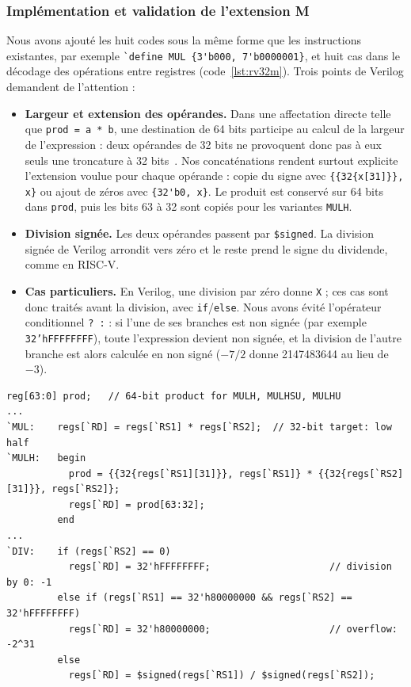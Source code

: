 \subsubsection{Implémentation et validation de l'extension M}
\label{sec:rv32im-impl}

Nous avons ajouté les huit codes sous la même forme que les instructions existantes, par exemple
\lstinline[style=vlinline]|`define MUL {3'b000, 7'b0000001}|, et huit cas dans le décodage des
opérations entre registres (code~\ref{lst:rv32m}). Trois points de Verilog demandent de
l'attention :
\begin{itemize}
\item \textbf{Largeur et extension des opérandes.} Dans une affectation directe telle que
\texttt{prod = a * b}, une destination de 64 bits participe au calcul de la largeur de
l'expression : deux opérandes de 32 bits ne provoquent donc pas à eux seuls une troncature
à 32 bits~\cite{systemverilog}. Nos concaténations rendent surtout explicite l'extension
voulue pour chaque opérande : copie du signe avec
\lstinline[style=vlinline]|{{32{x[31]}}, x}| ou ajout de zéros avec
\lstinline[style=vlinline]|{32'b0, x}|. Le produit est conservé sur 64 bits dans
\texttt{prod}, puis les bits 63 à 32 sont copiés pour les variantes \texttt{MULH}.
\item \textbf{Division signée.} Les deux opérandes passent par \texttt{\$signed}. La division
signée de Verilog arrondit vers zéro et le reste prend le signe du dividende, comme en RISC-V.
\item \textbf{Cas particuliers.} En Verilog, une division par zéro donne \texttt{X} ; ces cas sont
donc traités avant la division, avec \texttt{if}/\texttt{else}. Nous avons évité l'opérateur
conditionnel \texttt{? :} : si l'une de ses branches est non signée (par exemple
\texttt{32'hFFFFFFFF}), toute l'expression devient non signée, et la division de l'autre branche
est alors calculée en non signé ($-7 / 2$ donne 2147483644 au lieu de $-3$).
\end{itemize}

\noindent\begin{minipage}{\linewidth}
\begin{lstlisting}[style=verilog, caption={Extrait de l'implémentation de l'extension M}, label={lst:rv32m}]
reg[63:0] prod;   // 64-bit product for MULH, MULHSU, MULHU
...
`MUL:    regs[`RD] = regs[`RS1] * regs[`RS2];  // 32-bit target: low half
`MULH:   begin
           prod = {{32{regs[`RS1][31]}}, regs[`RS1]} * {{32{regs[`RS2][31]}}, regs[`RS2]};
           regs[`RD] = prod[63:32];
         end
...
`DIV:    if (regs[`RS2] == 0)
           regs[`RD] = 32'hFFFFFFFF;                     // division by 0: -1
         else if (regs[`RS1] == 32'h80000000 && regs[`RS2] == 32'hFFFFFFFF)
           regs[`RD] = 32'h80000000;                     // overflow: -2^31
         else
           regs[`RD] = $signed(regs[`RS1]) / $signed(regs[`RS2]);
\end{lstlisting}
\end{minipage}\par

